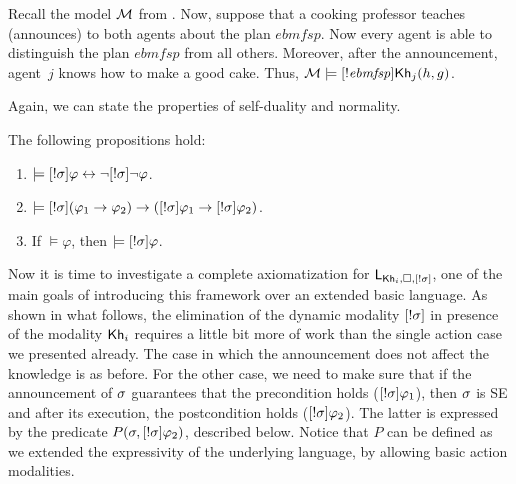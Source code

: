 \medskip 

\begin{example}\label{ex:sref}
Recall the model $\mathcal{M}$ from .
Now, suppose that a cooking professor teaches (announces) to both agents about the plan $\mathit{ebmfsp}$.
Now every agent is able to distinguish the plan $\mathit{ebmfsp}$ from all others.
Moreover, after the announcement, agent~$j$ knows how to make a good cake.
Thus, $\mathcal{M} \models [!\mathit{ebmfsp}] {\sf Kh}_j(h,g)$.
\end{example}

Again, we can state the properties of self-duality and normality.

\medskip 

\begin{proposition}
The following propositions hold:
\begin{enumerate}
\item $\models [!\sigma]\varphi \leftrightarrow \neg[!\sigma]\neg\varphi$. 
\item $\models [!\sigma](\varphi_1 \rightarrow \varphi_2) \rightarrow ([!\sigma]\varphi_1 \rightarrow [!\sigma]\varphi_2)$.
\item If $\models \varphi$, then $\models [!\sigma]\varphi$.
\end{enumerate}
\end{proposition}

Now it is time to investigate a complete axiomatization for $\mathsf{L}_{{\sf Kh}_i,\square,[!\sigma]}$, one of the main goals of introducing this framework over an extended basic language.
As shown in what follows, the elimination of the dynamic modality $[!\sigma]$ in presence of the modality ${\sf Kh}_i$ requires a little bit more of work than the single action case we presented already. The case in which the announcement does not affect the knowledge is as before.
For the other case, we need to make sure that if the announcement of $\sigma$ guarantees that the precondition holds ($[!\sigma]\varphi_1$), then $\sigma$ is SE and after its execution, the postcondition holds ($[!\sigma]\varphi_2$).
The latter is expressed by the predicate $P(\sigma,[!\sigma]\varphi_2)$, described below. Notice that $P$ can be defined as we extended the expressivity of the underlying language, by allowing basic action modalities.

